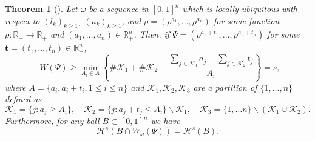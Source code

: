 \documentclass{amsart}
\newtheorem{theorem}{Theorem}[section]
\theoremstyle{definition}
\newcommand{\R}{\mathbb R}
\newcommand{\0}{\mbf 0}%
\newcommand{\cH}{\mathcal{H}}
\newcommand{\cK}{\mathcal{K}}
\DeclareMathOperator{\dimh}{\dim_H}
\def\R{\mathbb R}
\begin{document}
\begin{theorem}[{\cite{WW19}}] \label{MTPRR}
Let $\omega$ be a sequence in $[0,1]^n$ which is locally ubiquitous with respect to $(l_k)_{k\geq 1}$, $(u_k)_{k\geq 1}$, and $\rho=(\rho^{a_1},\ldots, \rho^{a_n})$ for some function $\rho:\R_{+} \to \R_{+}$ and $(a_{1},\dots, a_{n}) \in \R^{n}_{+}$.
Then, if $\Psi=(\rho^{a_{1}+t_{1}},\dots, \rho^{a_{n}+t_{n}})$ for some $\textbf{t}=(t_{1}, \dots, t_{n}) \in \R^{n}_{+}$,
\begin{equation*}
\dimh W(\Psi) 
\geq 
\min_{A_{i} \in A} 
\left\{ 
\#\cK_{1}
+ 
\#\cK_{2}
+
\frac{\sum\limits_{j \in \cK_{3}}a_{j} -\sum\limits_{j \in \cK_{2}}t_{j}}{A_{i}} 
\right\}=s,
\end{equation*}
where $A=\{ a_{i}, a_{i}+t_{i} , 1 \leq i \leq n \}$ and $\cK_{1},\cK_{2},\cK_{3}$ are a partition of $\{1, \dots, n\}$ defined as
\begin{equation*}
 \cK_{1}=\{ j:a_{j} \geq A_{i}\}, \quad \cK_{2}=\{j: a_{j}+t_{j} \leq A_{i} \} \backslash \cK_{1}, \quad \cK_{3}=\{1, \dots n\} \backslash (\cK_{1} \cup \cK_{2}).
 \end{equation*}
 Furthermore, for any ball $B \subset [0,1]^n$ we have
  \begin{equation} \label{MTPRR_measure}
\cH^{s}(B \cap W_{\omega}(\Psi))=\cH^{s}(B).
\end{equation}
 \end{theorem}

\end{document}
